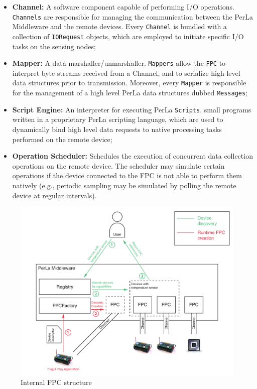 \begin{itemize}

    \item \textbf{Channel:} A software component capable of performing I/O
        operations. \texttt{Channels} are responsible for managing the
        communication between the PerLa Middleware and the remote devices.
        Every \texttt{Channel} is bundled with a collection of
        \texttt{IORequest} objects, which are employed to initiate specific I/O
        tasks on the sensing nodes;

    \item \textbf{Mapper:} A data marshaller/unmarshaller. \texttt{Mappers}
        allow the \texttt{FPC} to interpret byte streams received from a
        Channel, and to serialize high-level data structures prior to
        transmission. Moreover, every \texttt{Mapper} is responsible for the
        management of a high level PerLa data structures dubbed
        \texttt{Messages};

    \item \textbf{Script Engine:} An interpreter for executing PerLa
        \texttt{Scripts}, small programs written in a proprietary PerLa
        scripting language, which are used to dynamically bind high level data
        requests to native processing tasks performed on the remote device;

    \item \textbf{Operation Scheduler:} Schedules the execution of concurrent
        data collection operations on the remote device. The scheduler may
        simulate certain operations if the device connected to the FPC is not
        able to perform them natively (e.g., periodic sampling may be simulated
        by polling the remote device at regular intervals).

\end{itemize}

\begin{figure}[h!]
\includegraphics[width=\textwidth]{imgs/middleware_overview.pdf}
\caption{Internal FPC structure}
\label{fig:fpc_overview}
\end{figure}

